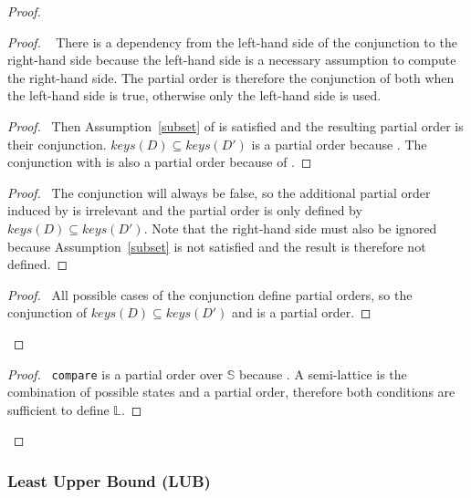 \documentclass[10pt, oneside]{article}   	%
\begin{document}
\begin{proof}
			\begin{proof}
				\pfsketch~ There is a dependency from the left-hand side of the conjunction to the right-hand side because the left-hand side is a necessary assumption to compute the right-hand side. The partial order is therefore the conjunction of both when the left-hand side is true, otherwise only the left-hand side is used.
				\begin{proof}
					\pf~Then Assumption~\ref{subset} of  is satisfied and the resulting partial order is their conjunction. $\textit{keys}(D) \subseteq \textit{keys}(D')$ is a partial order because . The conjunction with  is also a partial order because of .
				\end{proof}
				
				\begin{proof}
					\pf~The conjunction will always be false, so the additional partial order induced by  is irrelevant and the partial order is only defined by $\textit{keys}(D) \subseteq \textit{keys}(D')$. Note that the right-hand side must also be ignored because Assumption~\ref{subset} is not satisfied and the result is therefore not defined.
				\end{proof}
				
				\qedstep
				\begin{proof}
					\pf~All possible cases of the conjunction define partial orders, so the conjunction of $\textit{keys}(D) \subseteq \textit{keys}(D')$ and  is a partial order.
				\end{proof}
			\end{proof}
			
			\qedstep
			\begin{proof}
				\pf~\texttt{compare} is a partial order over $\mathds{S}$ because . A semi-lattice is the combination of possible states and a partial order, therefore both conditions are sufficient to define $\mathds{L}$.
			\end{proof}			
	\end{proof}

\subsubsection{Least Upper Bound (LUB)}
\label{sec:longer-proofs:lub}
\end{document}
